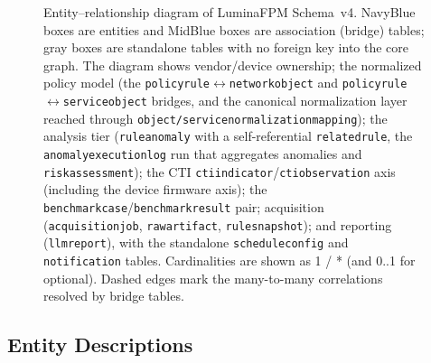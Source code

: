 \documentclass[12pt,a4paper]{report}
\renewcommand{\_}{\textunderscore\allowbreak}
\begin{document}
\begin{figure}
{}
\caption{Entity--relationship diagram of LuminaFPM Schema~v4. NavyBlue boxes are entities and MidBlue boxes are association (bridge) tables; gray boxes are standalone tables with no foreign key into the core graph. The diagram shows vendor/device ownership; the normalized policy model (the \texttt{policy\_rule}$\leftrightarrow$\texttt{network\_object} and \texttt{policy\_rule}$\leftrightarrow$\texttt{service\_object} bridges, and the canonical normalization layer reached through \texttt{object\_/service\_normalization\_mapping}); the analysis tier (\texttt{rule\_anomaly} with a self-referential \texttt{related\_rule}, the \texttt{anomaly\_execution\_log} run that aggregates anomalies and \texttt{risk\_assessment}); the CTI \texttt{cti\_indicator}/\texttt{cti\_observation} axis (including the device firmware axis); the \texttt{benchmark\_case}/\texttt{benchmark\_result} pair; acquisition (\texttt{acquisition\_job}, \texttt{raw\_artifact}, \texttt{rule\_snapshot}); and reporting (\texttt{llm\_report}), with the standalone \texttt{schedule\_config} and \texttt{notification} tables. Cardinalities are shown as 1 / * (and 0..1 for optional). Dashed edges mark the many-to-many correlations resolved by bridge tables.}
\label{fig:erd}
\end{figure}

\subsection{Entity Descriptions}
\end{document}
